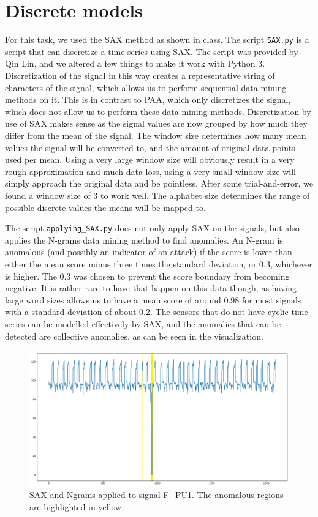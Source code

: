 \documentclass[]{article}
\begin{document}
\section{Discrete models}
For this task, we used the SAX method as shown in class. The script \texttt{SAX.py} is a script that can discretize a time series using SAX. The script was provided by Qin Lin, and we altered a few things to make it work with Python 3. Discretization of the signal in this way creates a representative string of characters of the signal, which allows us to perform sequential data mining methods on it. This is in contrast to PAA, which only discretizes the signal, which does not allow us to perform these data mining methods. Discretization by use of SAX makes sense as the signal values are now grouped by how much they differ from the mean of the signal. The window size determines how many mean values the signal will be converted to, and the amount of original data points used per mean. Using a very large window size will obviously result in a very rough approximation and much data loss, using a very small window size will simply approach the original data and be pointless. After some trial-and-error, we found a window size of 3 to work well. The alphabet size determines the range of possible discrete values the means will be mapped to. 

The script \texttt{applying\_SAX.py} does not only apply SAX on the signals, but also applies the N-grams data mining method to find anomalies. An N-gram is anomalous (and possibly an indicator of an attack) if the score is lower than either the mean score minus three times the standard deviation, or 0.3, whichever is higher. The 0.3 was chosen to prevent the score boundary from becoming negative. It is rather rare to have that happen on this data though, as having large word sizes allows us to have a mean score of around 0.98 for most signals with a standard deviation of about 0.2. The sensors that do not have cyclic time series can be modelled effectively by SAX, and the anomalies that can be detected are collective anomalies, as can be seen in the visualization.


\begin{figure}[H]
  \centering
  \includegraphics[width=12cm, keepaspectratio]{./visuallizations/SAX_anomaly.png}
  \caption{SAX and Ngrams applied to signal F\_PU1. The anomalous regions are highlighted in yellow.}
  \label{signals}
\end{figure}
\end{document}
